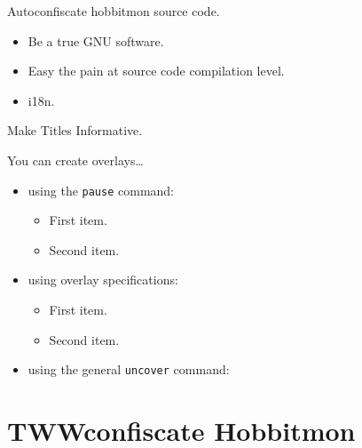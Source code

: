 \documentclass{beamer}
\begin{document}
\begin{frame}{Autoconfiscate hobbitmon source code.}

  \begin{itemize}
  \item
    Be a true GNU software. 
  \item
    Easy the pain at source code compilation level.
  \item
    i18n.
  \end{itemize}
\end{frame}

\begin{frame}{Make Titles Informative.}

  You can create overlays\dots
  \begin{itemize}
  \item using the \texttt{pause} command:
    \begin{itemize}
    \item
      First item.
      \pause
    \item    
      Second item.
    \end{itemize}
  \item
    using overlay specifications:
    \begin{itemize}
    \item<3->
      First item.
    \item<4->
      Second item.
    \end{itemize}
  \item
    using the general \texttt{uncover} command:
    \begin{itemize}
    \end{itemize}
  \end{itemize}

\end{frame}


\section{TWWconfiscate Hobbitmon}
\end{document}
